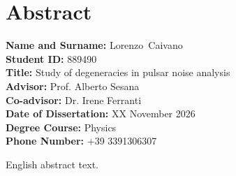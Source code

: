 \documentclass[12pt]{report}
\newcommand{\surnameEN}{Caivano}
\newcommand{\nameEN}{Lorenzo}
\newcommand{\matricolaEN}{889490}
\newcommand{\thesisTitleEN}{Study of degeneracies in pulsar noise analysis}
\newcommand{\advisorEN}{Prof. Alberto Sesana}
\newcommand{\coadvisorEN}{Dr. Irene Ferranti}
\newcommand{\defenseDateEN}{XX November 2026}
\newcommand{\degreeCourseEN}{Physics}
\newcommand{\phoneEN}{+39 3391306307}
\begin{document}
\chapter*{Abstract}
\begin{center}
\textbf{Name and Surname:} \nameEN \, \surnameEN \\[0.3cm]
\textbf{Student ID:} \matricolaEN \\[0.3cm]
\textbf{Title:} \thesisTitleEN \\[0.3cm]
\textbf{Advisor:} \advisorEN \\[0.3cm]
\textbf{Co-advisor:} \coadvisorEN \\[0.3cm]
\textbf{Date of Dissertation:} \defenseDateEN \\[0.3cm]
\textbf{Degree Course:} \degreeCourseEN \\[0.3cm]
\textbf{Phone Number:} \phoneEN \\
\vspace{1cm}
\end{center}
\sloppy

\noindent
English abstract text. \par
\end{document}
